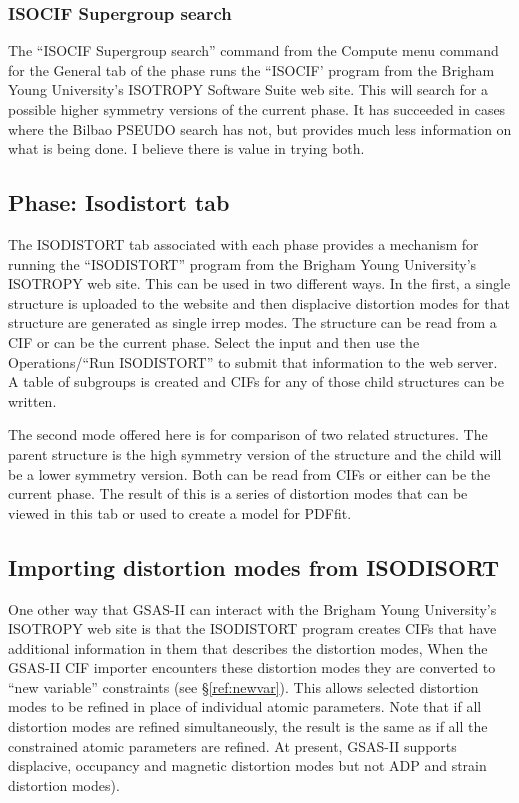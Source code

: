 \subsubsection{ISOCIF Supergroup search}
The ``ISOCIF Supergroup search''  command from the Compute menu command for the General tab of the phase runs the ``ISOCIF' program from the Brigham Young University's ISOTROPY Software Suite web site. This will search for a possible higher symmetry versions of the current phase. It has succeeded in cases where the Bilbao PSEUDO search has not, but provides much less information on what is being done. I believe there is value in trying both. 

\subsection{Phase: Isodistort tab}
The ISODISTORT tab associated with each phase provides a mechanism for running the  ``ISODISTORT'' program from the Brigham Young University's ISOTROPY web site. This can be used in two different ways. In the first, a single structure is uploaded to the website and then displacive distortion modes for that structure are generated as single irrep modes. The structure can be read from a CIF or can be the current phase. Select the input and then use the Operations/``Run ISODISTORT'' to submit that information to the web server. A table of subgroups is created and CIFs for any of those child structures can be written.  

The second mode offered here is for comparison of two related structures. The parent structure is the high symmetry version of the structure and the child will be a lower symmetry version. Both can be read from CIFs or either can be the current phase. The result of this is a series of distortion modes that can be viewed in this tab or used to create a model for PDFfit. 
 
\subsection{Importing distortion modes from ISODISORT}\label{ref:ISODISTORTcif}
One other way that GSAS-II can interact with the Brigham Young University's ISOTROPY web site is that the ISODISTORT program creates CIFs that have additional information in them that describes the distortion modes, When the GSAS-II CIF importer encounters these distortion modes they are converted to ``new variable'' constraints (see \S\ref{ref:newvar}). This allows selected distortion modes to be refined in place of individual atomic parameters. Note that if all distortion modes are refined simultaneously, the result is the same as if all the constrained atomic parameters are refined. At present, GSAS-II supports displacive, occupancy and magnetic distortion modes but not ADP and strain distortion modes). 

